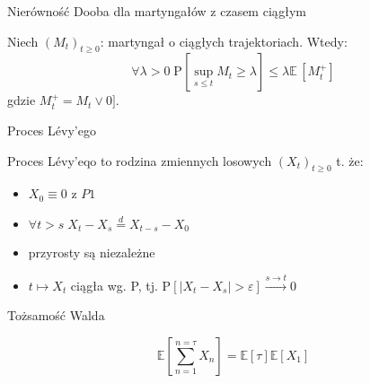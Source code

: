 \documentclass[avery5371, grid, frame]{flashcards}
\begin{document}
\begin{flashcard}[Twierdzenie]{Nierówność Dooba dla martyngałów z czasem ciągłym}

\smallskip
Niech $(M_t)_{t \geq 0}$: martyngał o ciągłych trajektoriach. Wtedy:
$$ \forall \lambda > 0 \; \text{P} \left[ \sup _{s \leq t} M_t \geq \lambda \right] \leq \lambda \mathbb{E} \, [M ^+ _t ] $$
gdzie $ M ^+ _t = M_t \lor 0 ]$.
\end{flashcard}


\begin{flashcard}[Definicja]{Proces L\'evy'ego}

\smallskip
Proces Lévy'eqo to rodzina zmiennych losowych $(X_t)_{t \geq 0}$ t. że:
\begin{itemize}
\item $X_0 \equiv 0$ z $P1$
\item $\forall t > s \; X_t - X_s \stackrel{d}{=} X_{t-s} - X_0 $
\item przyrosty są niezależne
\item $ t \mapsto X_t $ ciągła wg. P, tj. $\text{P} [ | X_t -X_s | > \varepsilon ] \stackrel{s \rightarrow t}{\rightarrow} 0 $
\end{itemize}
\end{flashcard}

\begin{flashcard}[Twierdzenie]{Tożsamość Walda}

\smallskip
$$ \mathbb{E} \left[ \sum _{n = 1} ^{n = \tau} X_n \right] = \mathbb{E}\left[\tau \right] \mathbb{E}\left[X_1 \right] $$
\end{flashcard}
\end{document}
